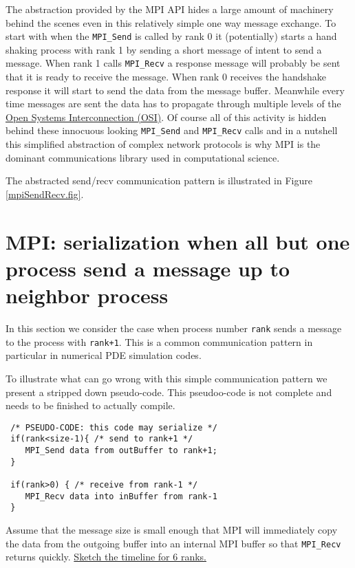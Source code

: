 The abstraction provided by the MPI API hides a large amount of machinery behind the scenes even in this relatively simple one way message exchange. To start with when the \texttt{MPI\_Send} is called by rank 0 it (potentially) starts a hand shaking process with rank 1 by sending a short message of intent to send a message. When rank 1 calls \texttt{MPI\_Recv} a response message will probably be sent that it is ready to receive the message. When rank 0 receives the handshake response it will start to send the data from the message buffer. Meanwhile every time messages are sent the data has to propagate through multiple levels of the \href{https://en.wikipedia.org/wiki/OSI_model}{Open Systems Interconnection (OSI)}. Of course all of this activity is hidden behind these innocuous looking \texttt{MPI\_Send} and \texttt{MPI\_Recv} calls and in a nutshell this simplified abstraction of complex network protocols is why MPI is the dominant communications library used in computational science. 


The abstracted send/recv communication pattern is illustrated in Figure \ref{mpiSendRecv.fig}.

\section{MPI: serialization when all but one process send a message up to neighbor process}

In this section we consider the case when  process number \texttt{rank} sends a message to the process with \texttt{rank+1}. This is a common communication pattern in particular in numerical PDE simulation codes.

To illustrate what can go wrong with this simple communication pattern we present a  stripped down pseudo-code. This pseudoo-code is not complete and needs to be finished to actually compile.

\begin{verbatim}
 /* PSEUDO-CODE: this code may serialize */
 if(rank<size-1){ /* send to rank+1 */
    MPI_Send data from outBuffer to rank+1;
 }

 if(rank>0) { /* receive from rank-1 */
    MPI_Recv data into inBuffer from rank-1
 }
\end{verbatim}

\begin{Exercise}
\label{mpiSmallMessageBlocked.ex}
Assume that the message size is small enough that MPI will immediately copy the data from the outgoing buffer into an internal MPI buffer so that  \texttt{MPI\_Recv} returns quickly.
\underline{Sketch the timeline for 6 ranks.}
\end{Exercise}

